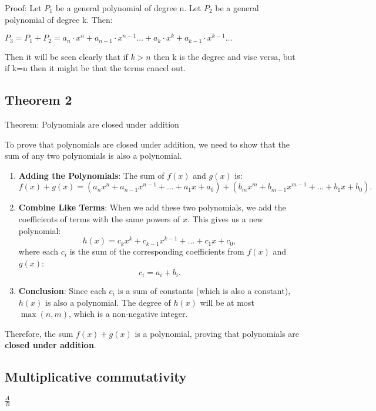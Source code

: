 \documentclass{article}
\begin{document}
Proof:
Let $ P_1$ be a general polynomial of degree n. Let $P_2$ be a general polynomial of degree k. Then:

$P_3 = P_1 + P_2 =a_n\cdot x^{n} + a_{n-1}\cdot x^{n-1}\dots + a_k\cdot x^{k} + a_{k-1}\cdot x^{k-1}\dots $

Then it will be seen clearly that if $k>n$ then k is the degree and vise versa, but if k=n then it might be that the terms cancel out.

\subsection{Theorem 2}
Theorem: Polynomials are closed under addition

To prove that polynomials are closed under addition, we need to show that the sum of any two polynomials is also a polynomial.

\begin{enumerate}
    \[
    f(x) = a_n x^n + a_{n-1} x^{n-1} + \dots + a_1 x + a_0,
    \]
    where \( a_i \) are constants (coefficients) and \( n \) is a non-negative integer (degree of the polynomial).
    
    Similarly, let \( g(x) \) be another polynomial:
    \[
    g(x) = b_m x^m + b_{m-1} x^{m-1} + \dots + b_1 x + b_0,
    \]
    where \( b_i \) are constants and \( m \) is a non-negative integer.
    
    \item \textbf{Adding the Polynomials}: The sum of \( f(x) \) and \( g(x) \) is:
    \[
    f(x) + g(x) = \left( a_n x^n + a_{n-1} x^{n-1} + \dots + a_1 x + a_0 \right) + \left( b_m x^m + b_{m-1} x^{m-1} + \dots + b_1 x + b_0 \right).
    \]
    
    \item \textbf{Combine Like Terms}: When we add these two polynomials, we add the coefficients of terms with the same powers of \( x \). This gives us a new polynomial:
    \[
    h(x) = c_k x^k + c_{k-1} x^{k-1} + \dots + c_1 x + c_0,
    \]
    where each \( c_i \) is the sum of the corresponding coefficients from \( f(x) \) and \( g(x) \):
    \[
    c_i = a_i + b_i.
    \]
    
    \item \textbf{Conclusion}: Since each \( c_i \) is a sum of constants (which is also a constant), \( h(x) \) is also a polynomial. The degree of \( h(x) \) will be at most \( \max(n, m) \), which is a non-negative integer.

\end{enumerate}

Therefore, the sum \( f(x) + g(x) \) is a polynomial, proving that polynomials are \textbf{closed under addition}.


\subsection{Multiplicative commutativity}

$
\frac A B
$
\end{document}

